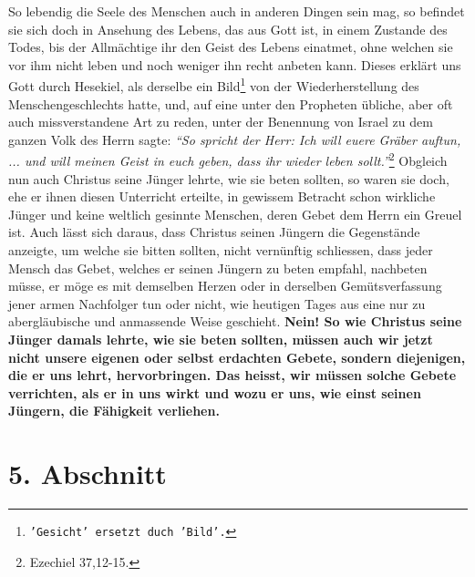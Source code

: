  So lebendig die Seele des Menschen auch in anderen
Dingen sein mag, so befindet
sie sich doch in Ansehung des Lebens, das aus Gott ist, in einem Zustande des
Todes, bis der Allmächtige ihr den Geist des Lebens einatmet, ohne welchen sie
vor ihm nicht leben und noch weniger ihn recht anbeten kann. Dieses erklärt uns
Gott durch Hesekiel, als derselbe ein Bild\footnote{\texttt{'Gesicht' ersetzt
duch
'Bild'.}} von der Wiederherstellung des
Menschengeschlechts hatte, und,
auf eine unter den Propheten übliche, aber oft auch
missverstandene Art zu
reden, unter der Benennung von Israel zu dem
ganzen Volk des Herrn sagte:
\textit{"`So spricht der Herr: Ich will euere Gräber auftun, ... und will meinen
Geist in
euch geben, dass ihr wieder leben sollt."'}\footnote{Ezechiel 37,12-15.}
Obgleich nun auch Christus seine
Jünger lehrte, wie sie beten sollten, so waren sie doch, ehe er ihnen diesen
Unterricht erteilte, in gewissem Betracht schon wirkliche Jünger und keine
weltlich gesinnte Menschen, deren Gebet dem Herrn ein Greuel ist. Auch
lässt sich daraus, dass Christus seinen Jüngern die Gegenstände anzeigte, um
welche sie bitten sollten, nicht
vernünftig schliessen, dass jeder Mensch das Gebet, welches er seinen Jüngern zu
beten empfahl, nachbeten müsse, er möge es mit
demselben Herzen oder in
derselben Gemütsverfassung jener armen Nachfolger tun oder nicht, wie heutigen
Tages aus eine nur zu abergläubische und anmassende Weise geschieht.
\label{ref:06_04_gebet} \textbf{Nein! So
wie Christus seine Jünger damals lehrte, wie sie beten sollten, müssen auch wir
jetzt nicht unsere eigenen oder selbst erdachten Gebete, sondern diejenigen, die
er uns
lehrt, hervorbringen. Das heisst, wir müssen solche Gebete verrichten, als er
in uns wirkt und wozu er uns, wie einst seinen Jüngern, die Fähigkeit
verliehen.}

\section{5. Abschnitt} \label{kap6_ab5}

